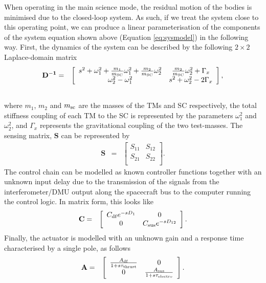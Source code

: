 When operating in the main science mode, the residual motion of the bodies is minimised
due to the closed-loop system. As such, if we treat the system close to this
operating point, we can produce a linear parameterisation
of the components of the system equation shown above (Equation \ref{eq:sysmodel})
in the following way. First, the dynamics of the system can be described
by the following $2\times2$ Laplace-domain matrix
\begin{eqnarray}
\label{eqn:freedynamics} \mathbf{D^{-1}} &=& \left[ {\begin{array}{*{20}c}
   {s^2  + \omega _1^2  + \frac{m_1}{m_{\rm SC}}\omega _1^2  + \frac{m_2}{m_{\rm SC}}\omega
_2^2 } & {\frac{m_2}{m_{\rm SC}}\omega _2^2  + \Gamma _x }  \\    {\omega _2^2
 - \omega _1^2 } & {s^2  + \omega _2^2  - 2\Gamma _x }  \\ \end{array}} \right],\\\nonumber
\end{eqnarray} 
where $m_1$, $m_2$ and $m_{\rm sc}$ are the masses
of the TMs and SC respectively, the total stiffness coupling of each TM to the
SC is represented by the parameters $\omega_1^2$ and $\omega_2^2$, and $\Gamma _x$
represents the gravitational coupling of the two test-masses.  The sensing matrix,
$\mathbf{S}$ can be represented by 
\begin{eqnarray}   \mathbf{S} &=& \left[\begin{array}{cc}
  S_{11} & S_{12} \\   S_{21} & S_{22} \\ \end{array}\right].
\end{eqnarray} 
The control chain can be modelled as known controller functions
together with an unknown input delay due to the transmission of the signals from
the interferometer/DMU output along the spacecraft bus to the computer running
the control logic. In matrix form, this looks like 
\begin{eqnarray}   
\mathbf{C}
&=& \left[\begin{array}{cc}   C_{\rm df}e^{-sD_{1}} & 0 \\   0 & C_{\rm sus}e^{-sD_{12}}
 \\ \end{array}\right]. 
\end{eqnarray} 
Finally, the actuator is modelled
with an unknown gain and a response time characterised by a single pole, as follows
\begin{eqnarray}   
\mathbf{A} &=& \left[\begin{array}{cc}   \frac{A_{\rm
df}}{1 + s\tau_{\rm thrust}} & 0 \\   0 & \frac{A_{\rm sus}}{1 + s\tau_{\rm electro}}
 \\ \end{array}\right]. 
\end{eqnarray}

